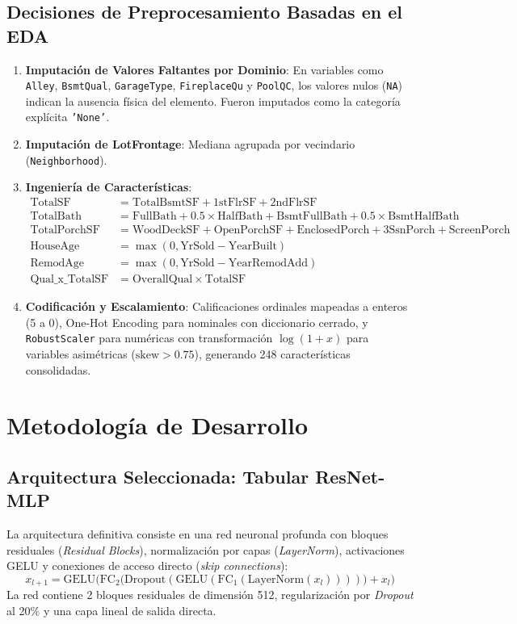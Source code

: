 \documentclass[11pt,a4paper]{article}
\begin{document}
\subsection{Decisiones de Preprocesamiento Basadas en el EDA}
\begin{enumerate}
    \item \textbf{Imputación de Valores Faltantes por Dominio}: En variables como \texttt{Alley}, \texttt{BsmtQual}, \texttt{GarageType}, \texttt{FireplaceQu} y \texttt{PoolQC}, los valores nulos (\texttt{NA}) indican la ausencia física del elemento. Fueron imputados como la categoría explícita \texttt{'None'}.
    \item \textbf{Imputación de LotFrontage}: Mediana agrupada por vecindario (\texttt{Neighborhood}).
    \item \textbf{Ingeniería de Características}:
    \begin{align}
        \text{TotalSF} &= \text{TotalBsmtSF} + \text{1stFlrSF} + \text{2ndFlrSF} \\
        \text{TotalBath} &= \text{FullBath} + 0.5 \times \text{HalfBath} + \text{BsmtFullBath} + 0.5 \times \text{BsmtHalfBath} \\
        \text{TotalPorchSF} &= \text{WoodDeckSF} + \text{OpenPorchSF} + \text{EnclosedPorch} + \text{3SsnPorch} + \text{ScreenPorch} \\
        \text{HouseAge} &= \max(0, \text{YrSold} - \text{YearBuilt}) \\
        \text{RemodAge} &= \max(0, \text{YrSold} - \text{YearRemodAdd}) \\
        \text{Qual\_x\_TotalSF} &= \text{OverallQual} \times \text{TotalSF}
    \end{align}
    \item \textbf{Codificación y Escalamiento}: Calificaciones ordinales mapeadas a enteros (5 a 0), One-Hot Encoding para nominales con diccionario cerrado, y \texttt{RobustScaler} para numéricas con transformación $\log(1+x)$ para variables asimétricas ($\text{skew} > 0.75$), generando 248 características consolidadas.
\end{enumerate}

\section{Metodología de Desarrollo}

\subsection{Arquitectura Seleccionada: Tabular ResNet-MLP}
La arquitectura definitiva consiste en una red neuronal profunda con bloques residuales (\textit{Residual Blocks}), normalización por capas (\textit{LayerNorm}), activaciones GELU y conexiones de acceso directo (\textit{skip connections}):
\begin{equation}
    x_{l+1} = \text{GELU}\Big( \text{FC}_2\big(\text{Dropout}(\text{GELU}(\text{FC}_1(\text{LayerNorm}(x_l))))\big) + x_l \Big)
\end{equation}
La red contiene 2 bloques residuales de dimensión 512, regularización por \textit{Dropout} al 20\% y una capa lineal de salida directa.
\end{document}
